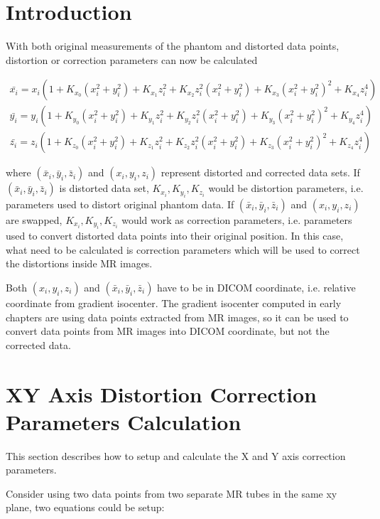 \section{Introduction}
With both original measurements of the phantom and distorted data points, distortion or correction 
parameters can now be calculated 

\begin{eqnarray} \label{eq:spherical_harmonics}
\bar{x_i} = x_i(1 + K_{x_0}(x_i^2 + y_i^2) + K_{x_1}z_i^2 + K_{x_2}z_i^2(x_i^2 + y_i^2) 
+ K_{x_3}(x_i^2 + y_i^2)^2 + K_{x_4}z_i^4) \\
\bar{y_i} = y_i(1 + K_{y_0}(x_i^2 + y_i^2) + K_{y_1}z_i^2 + K_{y_2}z_i^2(x_i^2 + y_i^2) 
+ K_{y_3}(x_i^2 + y_i^2)^2 + K_{y_4}z_i^4) \\
\bar{z_i} = z_i(1 + K_{z_0}(x_i^2 + y_i^2) + K_{z_1}z_i^2 + K_{z_2}z_i^2(x_i^2 + y_i^2) 
+ K_{z_3}(x_i^2 + y_i^2)^2 + K_{z_4}z_i^4)
\end{eqnarray}

where $(\bar{x}_i, \bar{y}_i, \bar{z}_i)$ and $(x_i, y_i, z_i)$ represent distorted and corrected data sets.
If $(\bar{x}_i, \bar{y}_i, \bar{z}_i)$ is distorted data set, $K_{x_i}, K_{y_i}, K_{z_i}$ would be 
distortion parameters, i.e. parameters used to distort original phantom data. If 
$(\bar{x}_i, \bar{y}_i, \bar{z}_i)$ and $(x_i, y_i, z_i)$ are swapped, $K_{x_i}, K_{y_i}, K_{z_i}$ would work as
correction parameters, i.e. parameters used to convert distorted data points into their original position.
In this case, what need to be calculated is correction parameters which will be used to correct the
distortions inside MR images.

Both $(x_i, y_i, z_i)$ and $(\bar{x}_i, \bar{y}_i, \bar{z}_i)$ have to be in DICOM coordinate, i.e. relative
coordinate from gradient isocenter. The gradient isocenter computed in early chapters are using data points
extracted from MR images, so it can be used to convert data points from MR images into DICOM coordinate, but 
not the corrected data. 

\section{XY Axis Distortion Correction Parameters Calculation}
This section describes how to setup and calculate the X and Y axis correction parameters.

Consider using two data points from two separate MR tubes in the same xy plane, two equations could be
setup:

